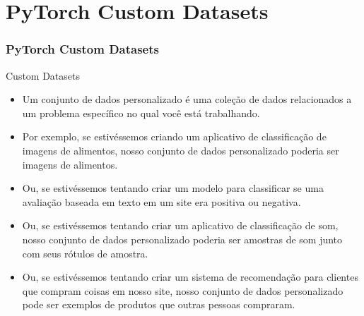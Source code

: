 \documentclass{beamer}
\begin{document}
\section{PyTorch Custom Datasets}
\begin{frame}
	\frametitle{PyTorch Custom Datasets}
	\begin{block}{Custom Datasets}
		
		\begin{itemize}
			\item Um conjunto de dados personalizado é uma coleção de dados relacionados a um problema específico no qual você está trabalhando.
			\item Por exemplo, se estivéssemos criando um aplicativo de classificação de imagens de alimentos, nosso conjunto de dados personalizado poderia ser imagens de alimentos.
			\item Ou, se estivéssemos tentando criar um modelo para classificar se uma avaliação baseada em texto em um site era positiva ou negativa.
			\item Ou, se estivéssemos tentando criar um aplicativo de classificação de som, nosso conjunto de dados personalizado poderia ser amostras de som junto com seus rótulos de amostra.
			\item Ou, se estivéssemos tentando criar um sistema de recomendação para clientes que compram coisas em nosso site, nosso conjunto de dados personalizado pode ser exemplos de produtos que outras pessoas compraram.
		\end{itemize}
	\end{block}
\end{frame}
\end{document}
